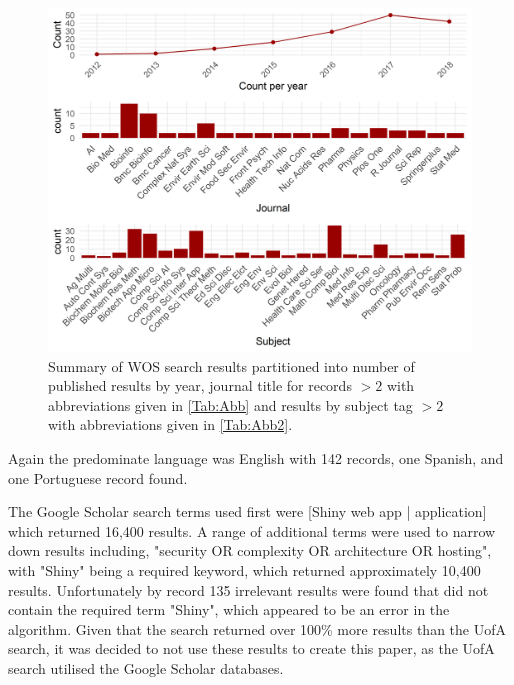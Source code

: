 \begin{figure}[ht]
	\centering
	\includegraphics[width=\textwidth]{3wayWOS.PNG}
	\caption{Summary of WOS search results partitioned into number of published results by year, journal title for records \(> 2\) with abbreviations given in \autoref{Tab:Abb} and results by subject tag \(> 2\) with abbreviations given in \autoref{Tab:Abb2}.}
	\label{Tab:fig_3}
\end{figure}

Again the predominate language was English with 142 records, one Spanish, and one Portuguese record found.

The Google Scholar search terms used first were [Shiny web app | application] which returned 16,400 results. A range of additional terms were used to narrow down results including, "security OR complexity OR architecture OR hosting", with "Shiny" being a required keyword, which returned approximately 10,400 results. Unfortunately by record 135 irrelevant results were found that did not contain the required term "Shiny", which appeared to be an error in the algorithm. Given that the search returned over 100\% more results than the UofA search, it was decided to not use these results to create this paper, as the UofA search utilised the Google Scholar databases.
	

